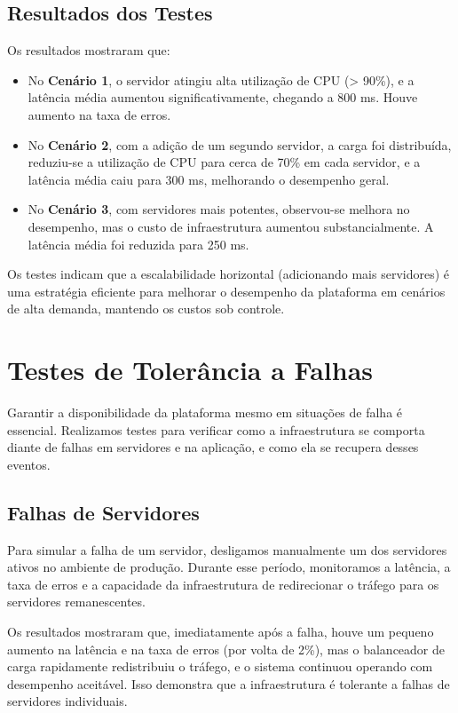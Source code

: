 \subsection{Resultados dos Testes}

Os resultados mostraram que:

\begin{itemize}
    \item No \textbf{Cenário 1}, o servidor atingiu alta utilização de CPU (> 90\%), e a latência média aumentou significativamente, chegando a 800 ms. Houve aumento na taxa de erros.
    \item No \textbf{Cenário 2}, com a adição de um segundo servidor, a carga foi distribuída, reduziu-se a utilização de CPU para cerca de 70\% em cada servidor, e a latência média caiu para 300 ms, melhorando o desempenho geral.
    \item No \textbf{Cenário 3}, com servidores mais potentes, observou-se melhora no desempenho, mas o custo de infraestrutura aumentou substancialmente. A latência média foi reduzida para 250 ms.
\end{itemize}

Os testes indicam que a escalabilidade horizontal (adicionando mais servidores) é uma estratégia eficiente para melhorar o desempenho da plataforma em cenários de alta demanda, mantendo os custos sob controle.

\section{Testes de Tolerância a Falhas}

Garantir a disponibilidade da plataforma mesmo em situações de falha é essencial. Realizamos testes para verificar como a infraestrutura se comporta diante de falhas em servidores e na aplicação, e como ela se recupera desses eventos.

\subsection{Falhas de Servidores}

Para simular a falha de um servidor, desligamos manualmente um dos servidores ativos no ambiente de produção. Durante esse período, monitoramos a latência, a taxa de erros e a capacidade da infraestrutura de redirecionar o tráfego para os servidores remanescentes.

Os resultados mostraram que, imediatamente após a falha, houve um pequeno aumento na latência e na taxa de erros (por volta de 2\%), mas o balanceador de carga rapidamente redistribuiu o tráfego, e o sistema continuou operando com desempenho aceitável. Isso demonstra que a infraestrutura é tolerante a falhas de servidores individuais.

